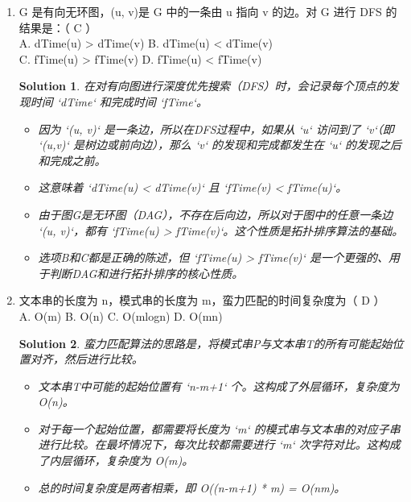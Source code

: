 \documentclass[UTF8]{report}
\newtheorem{solution}{Solution}
\theoremstyle{MyLineTheoremStyle} %
\theoremstyle{MyBlockTheoremStyle} %
\theoremstyle{MySubsubsectionStyle} %
\begin{document}
\begin{enumerate}
    \item G 是有向无环图，(u, v)是 G 中的一条由 u 指向 v 的边。对 G 进行 DFS 的结果是：（ C ）\\
    A. dTime(u) > dTime(v) \quad B. dTime(u) < dTime(v) \\
    C. fTime(u) > fTime(v) \quad D. fTime(u) < fTime(v)
    \begin{solution}
        在对有向图进行深度优先搜索（DFS）时，会记录每个顶点的发现时间 `dTime` 和完成时间 `fTime`。
        \begin{itemize}
            \item 因为 `(u, v)` 是一条边，所以在DFS过程中，如果从 `u` 访问到了 `v`（即 `(u,v)` 是树边或前向边），那么 `v` 的发现和完成都发生在 `u` 的发现之后和完成之前。
            \item 这意味着 `dTime(u) < dTime(v)` 且 `fTime(v) < fTime(u)`。
            \item 由于图G是无环图（DAG），不存在后向边，所以对于图中的任意一条边 `(u, v)`，都有 `fTime(u) > fTime(v)`。这个性质是拓扑排序算法的基础。
            \item 选项B和C都是正确的陈述，但 `fTime(u) > fTime(v)` 是一个更强的、用于判断DAG和进行拓扑排序的核心性质。
        \end{itemize}
    \end{solution}

    \item 文本串的长度为 n，模式串的长度为 m，蛮力匹配的时间复杂度为（ D ）\\
    A. O(m) \quad B. O(n) \quad C. O(mlogn) \quad D. O(mn)
    \begin{solution}
        蛮力匹配算法的思路是，将模式串P与文本串T的所有可能起始位置对齐，然后进行比较。
        \begin{itemize}
            \item 文本串T中可能的起始位置有 `n-m+1` 个。这构成了外层循环，复杂度为 O(n)。
            \item 对于每一个起始位置，都需要将长度为 `m` 的模式串与文本串的对应子串进行比较。在最坏情况下，每次比较都需要进行 `m` 次字符对比。这构成了内层循环，复杂度为 O(m)。
            \item 总的时间复杂度是两者相乘，即 O((n-m+1) * m) = O(nm)。
        \end{itemize}
    \end{solution}


\end{enumerate}
\end{document}

